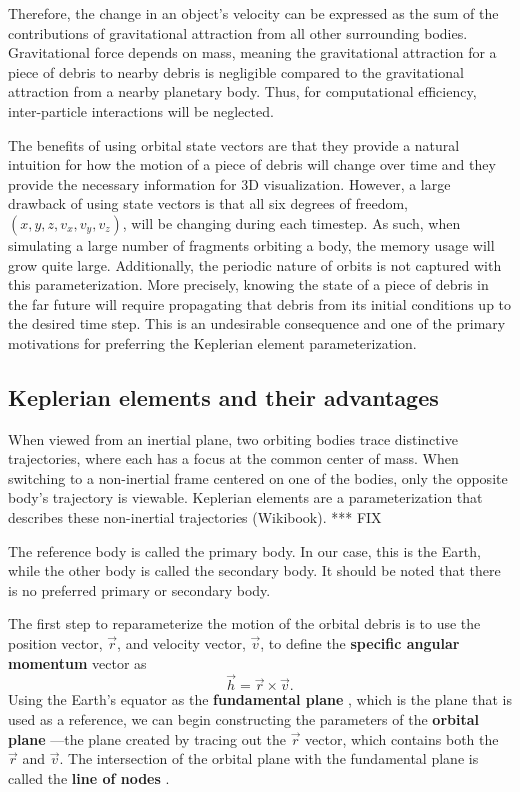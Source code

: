 \documentclass[a4paper, 12pt]{article}
\newcommand{\lindex}[1]{%
	\lowercase{\def\temp{#1}}%
	\expandafter\index\expandafter{\temp}%
}
\newcommand{\boldindex}[1]{%
	\textbf{#1}\lindex{#1}%
}
\begin{document}
Therefore, the change in an object's velocity can be expressed as the sum of the contributions of gravitational attraction from all other surrounding bodies. Gravitational force depends on mass, meaning the gravitational attraction for a piece of debris to nearby debris is negligible compared to the gravitational attraction from a nearby planetary body. Thus, for computational efficiency, inter-particle interactions will be neglected.

The benefits of using orbital state vectors are that they provide a natural intuition for how the motion of a piece of debris will change over time and they provide the necessary information for 3D visualization. However, a large drawback of using state vectors is that all six degrees of freedom, $ (x, y, z, v_x, v_y, v_z)$, will be changing during each timestep. As such, when simulating a large number of fragments orbiting a body, the memory usage will grow quite large. Additionally, the periodic nature of orbits is not captured with this parameterization. More precisely, knowing the state of a piece of debris in the far future will require propagating that debris from its initial conditions up to the desired time step. This is an undesirable consequence and one of the primary motivations for preferring the Keplerian element parameterization.
 
\newpage
\subsection{Keplerian elements and their advantages}

When viewed from an inertial plane, two orbiting bodies trace distinctive trajectories, where each has a focus at the common center of mass.  When switching to a non-inertial frame centered on one of the bodies, only the opposite body's trajectory is viewable. Keplerian elements are a parameterization that describes these non-inertial trajectories (Wikibook). *** FIX

The reference body is called the primary body. In our case, this is the Earth, while the other body is called the secondary body. It should be noted that there is no preferred primary or secondary body.

The first step to reparameterize the motion of the orbital debris is to use the position vector, $\vec{r}$, and velocity vector, $\vec{v}$, to define the \boldindex{specific angular momentum} vector as
\begin{equation}
\vec{h} = \vec{r} \times \vec{v}.
\end{equation}
Using the Earth's equator as the \boldindex{fundamental plane}, which is the plane that is used as a reference, we can begin constructing the parameters of the \boldindex{orbital plane}---the plane created by tracing out the $\vec{r}$ vector, which contains both the $\vec{r}$ and $\vec{v}$. The intersection of the orbital plane with the fundamental plane is called the \boldindex{line of nodes}.
\end{document}
